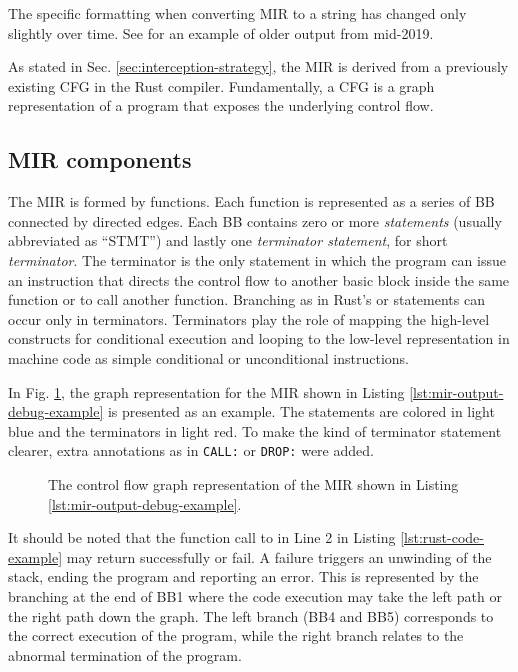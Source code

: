 The specific formatting when converting \acrshort{MIR} to a string has changed only slightly over time.
See \cite[Section 3.3]{meyer2020} for an example of older output from mid-2019.

As stated in Sec. \ref{sec:interception-strategy}, the \acrshort{MIR} is derived
from a previously existing \acrfull{CFG} in the Rust compiler.
Fundamentally, a \acrshort{CFG} is a graph representation of a program
that exposes the underlying control flow.

\subsection{MIR components}
\label{sec:mir-components}

The MIR is formed by functions.
Each function is represented as a series of \acrfull{BB} connected by directed edges.
Each \acrshort{BB} contains zero or more \emph{statements} (usually abbreviated as ``STMT'')
and lastly one \emph{terminator statement}, for short \emph{terminator}.
The terminator is the only statement in which the program can issue an instruction
that directs the control flow to another basic block inside the same function
or to call another function.
Branching as in Rust's  or  statements can occur only in terminators.
Terminators play the role of mapping the high-level constructs
for conditional execution and looping to the low-level representation in machine code
as simple conditional or unconditional  instructions.

In Fig. \ref{fig:mir-cfg-example}, the graph representation
for the MIR shown in Listing \ref{lst:mir-output-debug-example} is presented as an example.
The statements are colored in light blue and the terminators in light red.
To make the kind of terminator statement clearer,
extra annotations as in \texttt{CALL:} or \texttt{DROP:} were added.

\begin{figure}[!htb]
    \centering
    
    \caption{The control flow graph representation of the MIR shown in Listing \ref{lst:mir-output-debug-example}.}
    \label{fig:mir-cfg-example}
\end{figure}

It should be noted that the function call to 
in Line 2 in Listing \ref{lst:rust-code-example} may return successfully or fail.
A failure triggers an unwinding of the stack, ending the program and reporting an error.
This is represented by the branching at the end of BB1 where the code execution
may take the left path or the right path down the graph.
The left branch (BB4 and BB5) corresponds to the correct execution of the program,
while the right branch relates to the abnormal termination of the program.

